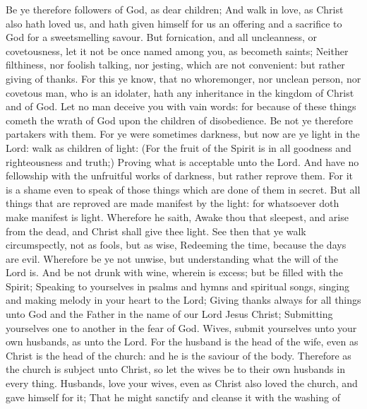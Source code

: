  Be ye therefore followers of God, as dear children;
 And walk in love, as Christ also hath loved us, and hath
given himself for us an offering and a sacrifice to God for a
sweetsmelling savour.  But fornication, and all uncleanness,
or covetousness, let it not be once named among you, as becometh saints;
 Neither filthiness, nor foolish talking, nor jesting, which
are not convenient: but rather giving of thanks.  For this
ye know, that no whoremonger, nor unclean person, nor covetous man, who
is an idolater, hath any inheritance in the kingdom of Christ and of
God.  Let no man deceive you with vain words: for because of
these things cometh the wrath of God upon the children of disobedience.
 Be not ye therefore partakers with them.  For
ye were sometimes darkness, but now are ye light in the Lord: walk as
children of light:  (For the fruit of the Spirit is in all
goodness and righteousness and truth;)  Proving what is
acceptable unto the Lord.  And have no fellowship with the
unfruitful works of darkness, but rather reprove them.  For
it is a shame even to speak of those things which are done of them in
secret.  But all things that are reproved are made manifest
by the light: for whatsoever doth make manifest is light. 
Wherefore he saith, Awake thou that sleepest, and arise from the dead,
and Christ shall give thee light.  See then that ye walk
circumspectly, not as fools, but as wise,  Redeeming the
time, because the days are evil.  Wherefore be ye not
unwise, but understanding what the will of the Lord is. 
And be not drunk with wine, wherein is excess; but be filled with the
Spirit;  Speaking to yourselves in psalms and hymns and
spiritual songs, singing and making melody in your heart to the Lord;
 Giving thanks always for all things unto God and the
Father in the name of our Lord Jesus Christ;  Submitting
yourselves one to another in the fear of God.  Wives,
submit yourselves unto your own husbands, as unto the Lord.
 For the husband is the head of the wife, even as Christ is
the head of the church: and he is the saviour of the body. 
Therefore as the church is subject unto Christ, so let the wives be to
their own husbands in every thing.  Husbands, love your
wives, even as Christ also loved the church, and gave himself for it;
 That he might sanctify and cleanse it with the washing of
